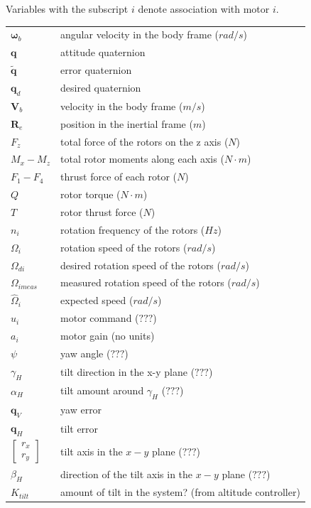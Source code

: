 \documentclass{article}
\numberwithin{equation}{section} %
\newcommand{\bs}[1]{\boldsymbol{#1}}
\begin{document}
Variables with the subscript $i$ denote association with motor $i$.\\
\begin{longtable}{p{2cm}p{8cm}}
 	$ \bs{\omega}_{b} $ 	& angular velocity in the body frame ($rad/s$) \\
 	$ \mathbf{q} $ 			& attitude quaternion \\
 	$ \tilde{\mathbf{q}} $	& error quaternion \\
 	$ \mathbf{q}_d $		& desired quaternion \\
 	$ \boldsymbol{V}_{b} $ 	& velocity in the body frame ($m/s$) \\
 	$ \boldsymbol{R}_{e} $	& position in the inertial frame ($m$) \\
 	$ F_{z} $				& total force of the rotors on the z axis ($N$) \\
 	$ M_{x} - M_{z} $		& total rotor moments along each axis ($N \cdot m$) \\
 	$ F_{1} - F_{4} $		& thrust force of each rotor ($N$) \\
 	$ Q $					& rotor torque ($N \cdot m$) \\
 	$ T $					& rotor thrust force ($N$) \\
 	$ n_i $					& rotation frequency of the rotors ($Hz$) \\
 	$ \Omega_i $			& rotation speed of the rotors ($rad / s$) \\	
 	$ \Omega_{di} $			& desired rotation speed of the rotors ($rad / s$) \\
 	$ \Omega_{imeas} $		& measured rotation speed of the rotors ($rad / s$) \\
 	$ \hat{\Omega}_i $		& expected speed ($rad / s$) \\
 	$ u_i $					& motor command ($???$) \\
 	$ a_i $					& motor gain (no units) \\
 	$ \psi $				& yaw angle ($???$) \\
 	$ \gamma_H $			& tilt direction in the x-y plane ($???$) \\
 	$ \alpha_H $			& tilt amount around $\gamma_H$ ($???$) \\
 	$ \bs{q}_V$				& yaw error \\
 	$ \bs{q}_H$				& tilt error \\
 	$ \begin{bmatrix}
 		r_x \\
 		r_y \end{bmatrix}$	& tilt axis in the $x-y$ plane ($???$) \\
 	$ \beta_H $				& direction of the tilt axis in the $x-y$ plane ($???$) \\
	$ K_{tilt} $			& amount of tilt in the system? (from altitude controller) \\
	 	
\end{longtable}
\end{document}
